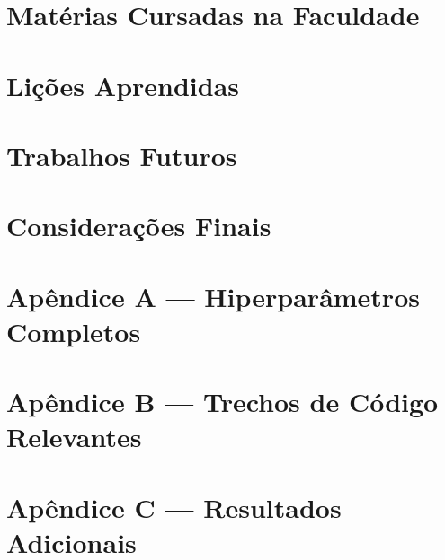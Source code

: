 \documentclass[12pt,a4paper]{article}
\begin{document}
\section{Matérias Cursadas na Faculdade}


\section{Lições Aprendidas}

\section{Trabalhos Futuros}

\section{Considerações Finais}




\appendix

\section{Apêndice A --- Hiperparâmetros Completos}

\section{Apêndice B --- Trechos de Código Relevantes}

\section{Apêndice C --- Resultados Adicionais}
\end{document}
